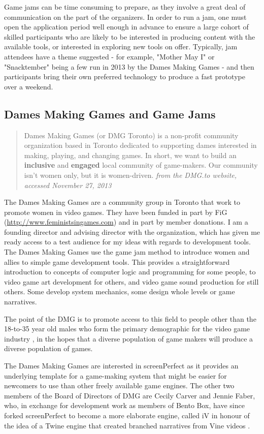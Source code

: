 Game jams can be time consuming to prepare, as they involve a great deal of communication on the part of the organizers. In order to run a jam, one must open the application period well enough in advance to ensure a large cohort of skilled participants who are likely to be interested in producing content with the available tools, or interested in exploring new tools on offer. Typically, jam attendees have a theme suggested - for example, "Mother May I" or "Snacktember" being a few run in 2013 by the Dames Making Games - and then participants bring their own preferred technology to produce a fast prototype over a weekend.

\subsection{Dames Making Games and Game Jams}
\begin{quote}
Dames Making Games (or DMG Toronto) is a non-profit community organization based in Toronto dedicated to supporting dames interested in making, playing, and changing games. In short, we want to build an \textbf{inclusive} and \textbf{engaged} local community of game-makers. Our community isn't women only, but it is women-driven.
\textit{from the DMG.to website, accessed November 27, 2013}
\end{quote}
The Dames Making Games are a community group in Toronto that work to promote women in video games. They have been funded in part by FiG (\url{http://www.feministsingames.com}) and in part by member donations. I am a founding director and advising director with the organization, which has given me ready access to a test audience for my ideas with regards to development tools. The Dames Making Games use the game jam method to introduce women and allies to simple game development tools. This provides a straightforward introduction to concepts of computer logic and programming for some people, to video game art development for others, and video game sound production for still others. Some develop system mechanics, some design whole levels or game narratives. 

The point of the DMG is to promote access to this field to people other than the 18-to-35 year old males who form the primary demographic for the video game industry \parencite{igda}\parencite{esa}, in the hopes that a diverse population of game makers will produce a diverse population of games.

The Dames Making Games are interested in screenPerfect as it provides an underlying template for a game-making system that might be easier for newcomers to use than other freely available game engines. The other two members of the Board of Directors of DMG are Cecily Carver and Jennie Faber, who, in exchange for development work as members of Bento Box, have since forked screenPerfect to become a more elaborate engine, called iV in honour of the idea of a Twine engine that created branched narratives from Vine videos \parencite{klimas}.
